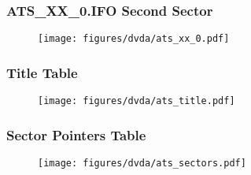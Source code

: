 \clearpage

\subsubsection{ATS\_XX\_0.IFO Second Sector}
\begin{figure}[h]
\texttt{[image: figures/dvda/ats\_xx\_0.pdf]}
\end{figure}

\subsubsection{Title Table}
\begin{figure}[h]
  \texttt{[image: figures/dvda/ats\_title.pdf]}
\end{figure}

\subsubsection{Sector Pointers Table}
\begin{figure}[h]
  \texttt{[image: figures/dvda/ats\_sectors.pdf]}
\end{figure}
